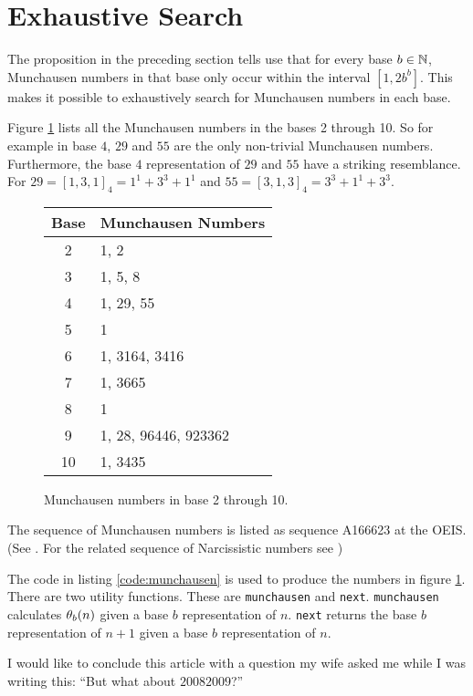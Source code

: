 \section*{Exhaustive Search}

The proposition in the preceding section tells use that for every base 
$b \in \N$, Munchausen numbers in that base only occur within the interval 
$[1,2b^{b}]$. This makes it possible to exhaustively search for Munchausen 
numbers in each base.

Figure \ref{figure:munchausen} lists all the Munchausen numbers in the bases 2
through 10. So for example in base $4$, $29$ and $55$ are the only non-trivial
Munchausen numbers. Furthermore, the base $4$ representation of $29$ and $55$
have a striking resemblance. For $29 = [1,3,1]_{4} = 1^{1} + 3^{3} + 1^{1}$ and
$55 = [3,1,3]_{4} = 3^{3} + 1^{1} + 3^{3}$.

\begin{figure}[bh]
	\begin{center}
		\caption{Munchausen numbers in base 2 through 10.}
		\label{figure:munchausen}
		\begin{tabular}{|c|l|}
			\hline
			Base & Munchausen Numbers \\
			\hline
			2  & 1, 2 \\
			3  & 1, 5, 8 \\
			4  & 1, 29, 55 \\
			5  & 1 \\
			6  & 1, 3164, 3416 \\
			7  & 1, 3665 \\
			8  & 1 \\
			9  & 1, 28, 96446, 923362 \\
			10 & 1, 3435 \\
			\hline
		\end{tabular}
	\end{center}
\end{figure}

The sequence of Munchausen numbers is listed as sequence A166623 at the OEIS. 
(See \cite{oeis:munchausen}. For the related sequence of Narcissistic numbers see
\cite{oeis:narcissistic})

The code in listing \ref{code:munchausen} is used to produce the numbers in
figure \ref{figure:munchausen}. There are two utility functions. These are 
\lstinline!munchausen! and \lstinline!next!. \lstinline!munchausen! calculates 
$\P_{b}(n)$ given a base $b$ representation of $n$. \lstinline!next! returns the
base $b$ representation of $n+1$ given a base $b$ representation of $n$.

I would like to conclude this article with a question my wife asked me while I
was writing this: ``But what about $20082009$?''



